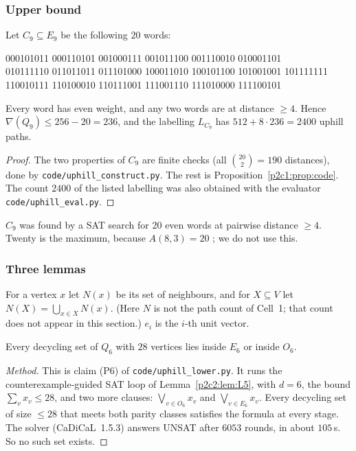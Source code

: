\subsubsection{Upper bound}\label{p2c5:sec:upper}

\begin{proposition}\label{p2c5:prop:upper}
Let $C_9\subseteq E_9$ be the following $20$ words:
\begin{center}\small{} 000101011 000110101 001000111 001011100 001110010 010001101\\
010111110 011011011 011101000 100011010 100101100 101001001 101111111\\
110010111 110100010 110111001 111001110 111010000 111100101
\end{center}
Every word has even weight, and any two words are at distance $\ge4$. Hence
$\nabla(Q_9)\le256-20=236$, and the labelling $L_{C_9}$ has $512+8\cdot236=2400$ uphill paths.
\end{proposition}

\begin{proof}
The two properties of $C_9$ are finite checks (all $\binom{20}{2}=190$ distances), done by
\texttt{code/uphill\_construct.py}. The rest is Proposition~\ref{p2c1:prop:code}. The count $2400$
of the listed labelling was also obtained with the evaluator \texttt{code/uphill\_eval.py}.
\end{proof}

$C_9$ was found by a SAT search for $20$ even words at pairwise distance $\ge4$. Twenty is the
maximum, because $A(8,3)=20$ \cite{MS77}; we do not use this.

\subsubsection{Three lemmas}\label{p2c5:sec:lemmas}

For a vertex $x$ let $N(x)$ be its set of neighbours, and for $X\subseteq V$ let
$N(X)=\bigcup_{x\in X}N(x)$. (Here $N$ is not the path count of Cell~1; that count does not
appear in this section.) $e_i$ is the $i$-th unit vector.

\begin{lemma}\label{p2c5:lem:P6}
Every decycling set of $Q_6$ with $28$ vertices lies inside $E_6$ or inside $O_6$.
\end{lemma}

\begin{proof}[Method]
This is claim (P6) of \texttt{code/uphill\_lower.py}. It runs the counterexample-guided SAT loop of
Lemma~\ref{p2c2:lem:L5}, with $d=6$, the bound $\sum_vx_v\le28$, and two more clauses:
$\bigvee_{v\in O_6}x_v$ and $\bigvee_{v\in E_6}x_v$. Every decycling set of size $\le28$ that meets
both parity classes satisfies the formula at every stage. The solver (CaDiCaL~1.5.3) answers UNSAT
after $6053$ rounds, in about $105$\,s. So no such set exists.
\end{proof}

